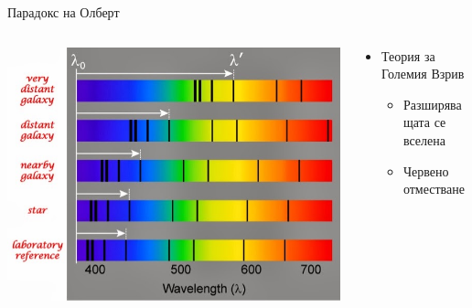\documentclass[10pt,a4paper]{beamer}
\begin{document}
        \begin{frame}{ Парадокс на Олберт }
            \begin{columns}
                \begin{column}{0.5\textwidth}
                    \includegraphics[width=\textwidth]{images/big_bang_redshift.jpg}
                \end{column}
                \begin{column}{0.5\textwidth}
                    \begin{itemize}
                        \item Теория за Големия Взрив \begin{itemize}
                            \item Разширяващата се вселена
                            \item Червено отместване
                        \end{itemize}
                    \end{itemize}
                \end{column}
            \end{columns}
        \end{frame}
        
\end{document}
